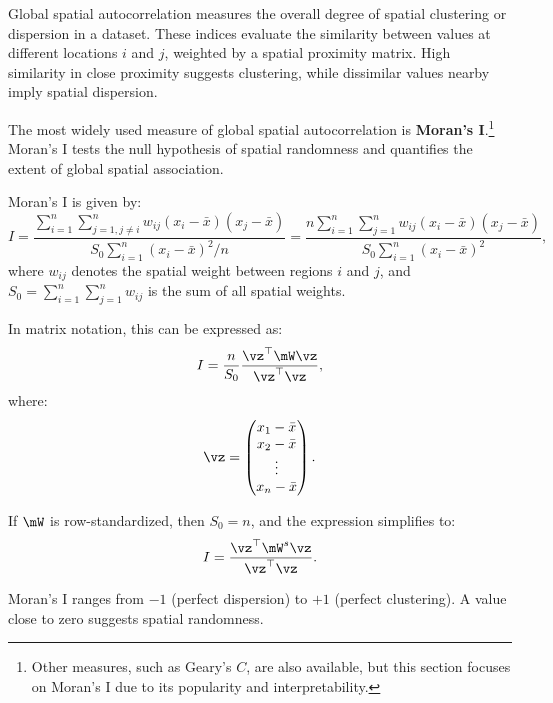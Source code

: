 \documentclass[english,12pt]{book}\usepackage[]{graphicx}\usepackage[]{xcolor}
\begin{document}
Global spatial autocorrelation measures the overall degree of spatial clustering or dispersion in a dataset. These indices evaluate the similarity between values at different locations $i$ and $j$, weighted by a spatial proximity matrix. High similarity in close proximity suggests clustering, while dissimilar values nearby imply spatial dispersion.

The most widely used measure of global spatial autocorrelation is \textbf{Moran's I}.\footnote{Other measures, such as Geary's $C$, are also available, but this section focuses on Moran's I due to its popularity and interpretability.} Moran's I tests the null hypothesis of spatial randomness and quantifies the extent of global spatial association.

Moran's I is given by:
\begin{equation}\label{eq:I-moran}
I = \frac{\sum_{i = 1}^n\sum_{j=1, j\neq i}^n w_{ij}\left(x_i - \bar{x}\right)\left(x_j - \bar{x}\right)}{S_0 \sum_{i = 1}^n\left(x_i - \bar{x}\right)^2/n} = \frac{n\sum_{i = 1}^n\sum_{j=1}^n w_{ij}\left(x_i - \bar{x}\right)\left(x_j - \bar{x}\right)}{S_0 \sum_{i = 1}^n\left(x_i - \bar{x}\right)^2},
\end{equation}
%
where $w_{ij}$ denotes the spatial weight between regions $i$ and $j$, and $S_0 = \sum_{i=1}^n\sum_{j=1}^n w_{ij}$ is the sum of all spatial weights.

In matrix notation, this can be expressed as:
\begin{equation*}
	I = \frac{n}{S_0} \frac{\vz^\top\mW\vz}{\vz^\top\vz},
\end{equation*}
%
where: 
\begin{equation*}
\vz = \begin{pmatrix}
          x_1 - \bar{x}\\
          x_2 - \bar{x} \\
          \vdots\\
          x_n - \bar{x}
      \end{pmatrix}.
\end{equation*}

If $\mW$ is row-standardized, then $S_0 = n$, and the expression simplifies to:
\begin{equation*}
I = \frac{\vz^\top \mW^s \vz}{\vz^\top \vz}.
\end{equation*}

Moran’s I ranges from $-1$ (perfect dispersion) to $+1$ (perfect clustering). A value close to zero suggests spatial randomness.
\end{document}
